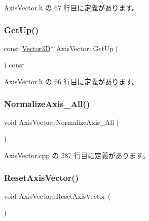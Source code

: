  Axis\+Vector.\+h の 67 行目に定義があります。

\mbox{\label{class_axis_vector_aba45ae6f91ac516e6e42fdb8bcfcae2e}} 
\subsubsection{\texorpdfstring{Get\+Up()}{GetUp()}}
{\footnotesize\ttfamily const \mbox{\hyperlink{class_vector3_d}{Vector3D}}$\ast$ Axis\+Vector\+::\+Get\+Up (\begin{DoxyParamCaption}{ }\end{DoxyParamCaption}) const\hspace{0.3cm}{\ttfamily [inline]}}



 Axis\+Vector.\+h の 66 行目に定義があります。

\mbox{\label{class_axis_vector_abd3b0ec608bc18dc9996cf9fa1d121b0}} 
\subsubsection{\texorpdfstring{Normalize\+Axis\+\_\+\+All()}{NormalizeAxis\_All()}}
{\footnotesize\ttfamily void Axis\+Vector\+::\+Normalize\+Axis\+\_\+\+All (\begin{DoxyParamCaption}{ }\end{DoxyParamCaption})\hspace{0.3cm}{\ttfamily [private]}}



 Axis\+Vector.\+cpp の 287 行目に定義があります。

\mbox{\label{class_axis_vector_a1414c1390a31d9e98c26d9803c61d2b8}} 
\subsubsection{\texorpdfstring{Reset\+Axis\+Vector()}{ResetAxisVector()}}
{\footnotesize\ttfamily void Axis\+Vector\+::\+Reset\+Axis\+Vector (\begin{DoxyParamCaption}{ }\end{DoxyParamCaption})}



